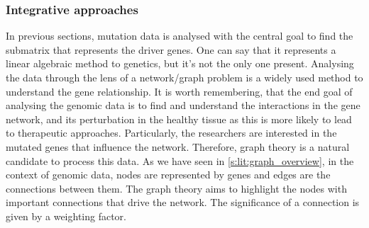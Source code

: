 

\subsubsection{Integrative approaches} \label{s:lit:multi-view}

\vspace{3mm}
\vspace{3mm}

In previous sections, mutation data is analysed with the central goal to find the submatrix that represents the driver genes. One can say that it represents a linear algebraic method to genetics, but it's not the only one present. Analysing the data through the lens of a network/graph problem is a widely used method to understand the gene relationship. It is worth remembering, that the end goal of analysing the genomic data is to find and understand the interactions in the gene network, and its perturbation in the healthy tissue as this is more likely to lead to therapeutic approaches. Particularly, the researchers are interested in the mutated genes that influence the network. Therefore, graph theory is a natural candidate to process this data. As we have seen in \cref{s:lit:graph_overview}, in the context of genomic data, nodes are represented by genes and edges are the connections between them. The graph theory aims to highlight the nodes with important connections that drive the network. The significance of a connection is given by a weighting factor.

